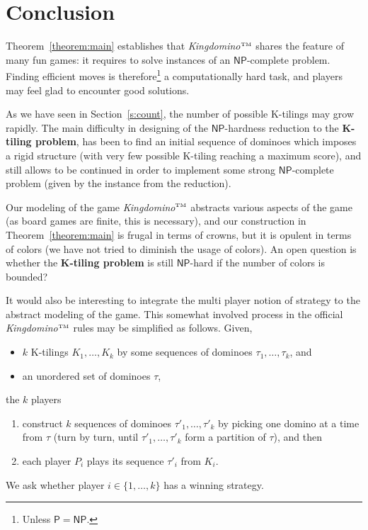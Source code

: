 \documentclass[11pt,a4paper]{article}
\newcommand{\1}{\mathbb{1}}
\newcommand{\0}{\mathbb{0}}
\newcommand{\Poly}{{\mathsf{P}}}
\newcommand{\NP}{{\mathsf{NP}}}
\newcommand{\tm}{$^\text{\tiny TM}$}
\begin{document}
\section{Conclusion}
\label{s:conc}

Theorem~\ref{theorem:main} establishes that {\em Kingdomino\tm} shares the
feature of many fun games: it requires to solve instances of an $\NP$-complete
problem. Finding efficient moves is therefore\footnote{Unless $\Poly=\NP$.}
a computationally hard
task, and players may feel glad to encounter good solutions.

As we have seen in Section~\ref{s:count}, the number of possible K-tilings may
grow rapidly. The main difficulty in designing of the $\NP$-hardness
reduction to the {\bf K-tiling problem}, has been to find an initial sequence
of dominoes which imposes a rigid structure (with very few possible K-tiling
reaching a maximum score), and still allows to be continued in order to
implement some strong $\NP$-complete problem (given by the instance from the
reduction).

\bigskip

Our modeling of the game {\em Kingdomino\tm} abstracts various aspects of the
game (as board games are finite, this is necessary), and our construction in
Theorem~\ref{theorem:main} is frugal in terms of crowns, but it is opulent in
terms of colors (we have not tried to diminish the usage of colors).
An open question is whether the {\bf K-tiling problem} is
still $\NP$-hard if the number of colors is
bounded?

\bigskip

It would also be interesting to integrate the multi player notion of strategy
to the abstract modeling of the game.
This somewhat involved process in the
official {\em Kingdomino\tm} rules may be simplified
as follows.
Given,
\begin{itemize}
  \item $k$ K-tilings $K_1,\dots,K_k$ by some sequences of dominoes
    $\tau_1,\dots,\tau_k$, and
  \item an unordered set of dominoes $\tau$,
\end{itemize}
the $k$ players
\begin{enumerate}
  \item construct $k$ sequences of dominoes $\tau'_1,\dots,\tau'_k$
    by picking one domino at a time from $\tau$
    (turn by turn, until $\tau'_1,\dots,\tau'_k$ form a partition of $\tau$),
    and then
  \item each player $P_i$ plays its sequence $\tau'_i$ from $K_i$.
\end{enumerate}
We ask whether player $i \in \{1,\dots,k\}$ has a winning
strategy.
\end{document}
